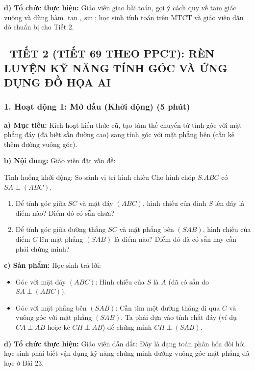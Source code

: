 \documentclass[12pt, a4paper]{article}
\begin{document}
\noindent \textbf{d) Tổ chức thực hiện:}
Giáo viên giao bài toán, gợi ý cách quy về tam giác vuông và dùng hàm $\tan, \sin$; học sinh tính toán trên MTCT và giáo viên dặn dò chuẩn bị cho Tiết 2.

\vspace{10pt}

\subsection*{\faClockO \ TIẾT 2 (TIẾT 69 THEO PPCT): RÈN LUYỆN KỸ NĂNG TÍNH GÓC VÀ ỨNG DỤNG ĐỒ HỌA AI}

\subsubsection*{1. Hoạt động 1: Mở đầu (Khởi động) (5 phút)}

\noindent \textbf{a) Mục tiêu:}
Kích hoạt kiến thức cũ, tạo tâm thế chuyển từ tính góc với mặt phẳng đáy (đã biết sẵn đường cao) sang tính góc với mặt phẳng bên (cần kẻ thêm đường vuông góc).

\noindent \textbf{b) Nội dung:}
Giáo viên đặt vấn đề:
\begin{pedabox}{Tình huống khởi động: So sánh vị trí hình chiếu}
Cho hình chóp $S.ABC$ có $SA \perp (ABC)$.
\begin{enumerate}[leftmargin=0.6cm]
    \item Để tính góc giữa $SC$ và mặt đáy $(ABC)$, hình chiếu của đỉnh $S$ lên đáy là điểm nào? Điểm đó có sẵn chưa?
    \item Để tính góc giữa đường thẳng $SC$ và mặt phẳng bên $(SAB)$, hình chiếu của điểm $C$ lên mặt phẳng $(SAB)$ là điểm nào? Điểm đó đã có sẵn hay cần phải chứng minh?
\end{enumerate}
\end{pedabox}

\noindent \textbf{c) Sản phẩm:}
Học sinh trả lời:
\begin{itemize}
    \item Góc với mặt đáy $(ABC)$: Hình chiếu của $S$ là $A$ (đã có sẵn do $SA \perp (ABC)$).
    \item Góc với mặt phẳng bên $(SAB)$: Cần tìm một đường thẳng đi qua $C$ và vuông góc với mặt phẳng $(SAB)$. Ta phải dựa vào tính chất đáy (ví dụ $CA \perp AB$ hoặc kẻ $CH \perp AB$) để chứng minh $CH \perp (SAB)$.
\end{itemize}

\noindent \textbf{d) Tổ chức thực hiện:}
Giáo viên dẫn dắt: Đây là dạng toán phân hóa đòi hỏi học sinh phải biết vận dụng kỹ năng chứng minh đường vuông góc mặt phẳng đã học ở Bài 23.
\end{document}

